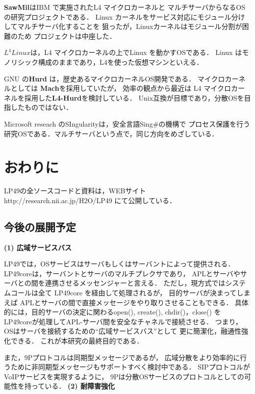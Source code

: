 \documentclass{ieicej}
\begin{document}
{\bf SawMil}\cite{SawMill}はIBM で実施されたL4 マイクロカーネルと
マルチサーバからなるOS の研究プロジェクトである．
Linux カーネルをサービス対応にモジュール分けしてマルチサーバ化することを
狙ったが，Linuxカーネルはモジュール分割が困難のため
プロジェクトは中座した．

{\bf $L^4Linux$}\cite{L4Linux}は，L4 マイクロカーネルの上でLinux を動かすOSである．
Linux はモノリシック構成のままであり，L4を使った仮想マシンといえる．

GNU の{\bf Hurd} は，歴史あるマイクロカーネルOS開発である．
マイクロカーネルとしては {\bf Mach}を採用していたが，
効率の観点から最近は L4 マイクロカーネルを採用した{\bf L4-Hurd}\cite{L4Hurd}を検討している．
Unix互換が目標であり，分散OSを目指したものではない．

Microsoft reseach のSIngularity\cite{Singularity}は，安全言語Sing\#の機構で
プロセス保護を行う研究OSである．マルチサーバという点で，同じ方向をめざしている．


\section{おわりに}

LP49の全ソースコードと資料は，WEBサイト 
http://research.nii.ac.jp/H2O/LP49\cite{LP49HP} にて公開している．

\subsection{今後の展開予定}

{\bf\flushleft (1) 広域サービスバス}

LP49では，OSサービスはサーバもしくはサーバントによって提供される．
LP49coreは，サーバントとサーバのマルチプレクサであり，
APLとサーバやサーバとの間を連携させるメッセンジャーと言える．
ただし，現方式ではシステムコールは全て LP49core を経由して処理されるが，
目的サーバが決まってしまえば
APLとサーバの間で直接メッセージをやり取りさせることもできる．
具体的には，目的サーバの決定に関わるopen(), create(), chdir()，close() を
LP49coreが処理してAPL-サーバ間を安全なチャネルで接続させる．
つまり，OSはサーバを接続するための``広域サービスバス''として
更に簡潔化，融通性強化できる．
これが本研究の最終目的である．

また，9Pプロトコルは同期型メッセージであるが，
広域分散をより効率的に行うために非同期型メッセージもサポートすべく検討中である．
SIP\cite{SIP}プロトコルがVoIPサービスを実現するように，
9Pは分散OSサービスのプロトコルとしての可能性を持っている．
%
{\bf\flushleft (2) 耐障害強化}
\end{document}

